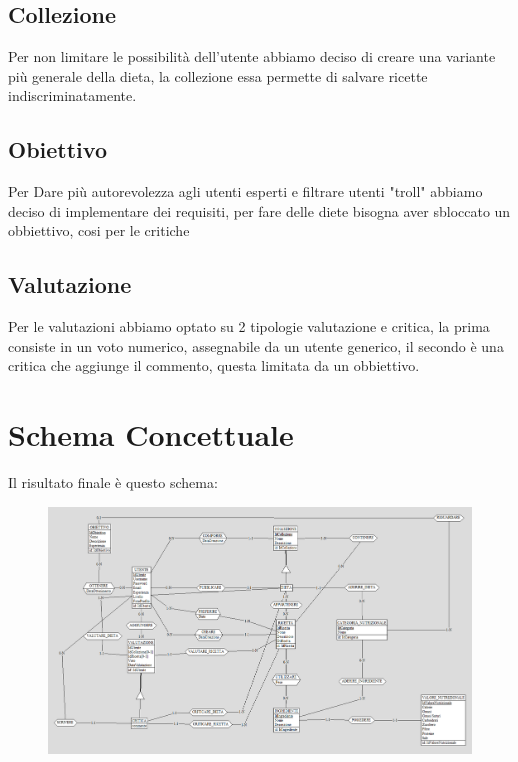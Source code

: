 ﻿\documentclass[a4paper,12pt]{report}
\begin{document}
\subsection{Collezione}
Per non limitare le possibilità dell'utente abbiamo deciso di creare 
una variante più generale della dieta, la collezione
essa permette di salvare ricette indiscriminatamente.
\subsection{Obiettivo}
Per Dare più autorevolezza agli utenti esperti e
filtrare utenti "troll" abbiamo deciso di implementare dei requisiti,
per fare delle diete bisogna aver sbloccato un obbiettivo, 
cosi per le critiche
\subsection{Valutazione}
Per le valutazioni abbiamo optato su 2 tipologie
valutazione e critica, la prima consiste in un voto
numerico, assegnabile da un utente generico, il secondo è una critica
che aggiunge il commento, questa limitata da un obbiettivo.


\section{Schema Concettuale}
Il risultato finale è questo schema:
\begin{figure}[H]
    \centering
    \includegraphics[width=0.9\linewidth]{app_images/schema-concettuale.png}
\end{figure}
\end{document}
